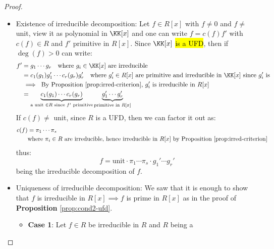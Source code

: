 \begin{proof}
	\leavevmode
	\begin{itemize}
		\item Existence of irreducible decomposition: Let \( f \in R[x] \) with \( f \ne 0 \) and \( f \ne  \)
		      unit, view it as polynomial in \( \KK[x] \) and one can write \( f = c(f) f' \) with \( c(f) \in
		      R\) and \( f' \) primitive in \( R[x] \). Since \( \KK[x]\) \hl{is a UFD}, then if \( \deg(f) > 0 \)
		      can write:
		      \[
			      \begin{aligned}
				      f' & = g_1\cdots g_r \quad \text{where } g_i \in \KK[x] \text{ are irreducible}                                               \\
				         & = c_1(g_1) g_1' \cdots c_r(g_r) g_r' \quad \text{where } g_i' \in R[x] \text{ are
				      primitive and irreducible in \( \KK[x] \) since \( g'_i \) is}                                                                \\
				         & \implies \text{ By Proposition \ref{prop:irred-criterion}, \( g_i' \) is
				      irreducible in \( R[x] \) }                                                                                                   \\
				         & = \underbrace{c_1(g_1) \cdots c_r(g_r)}_{\text{a unit }\in R \text{ since }f' \text{ primitive}} \underbrace{g_1' \cdots
					      g_r'}_{\text{primitive in } R[x]}
			      \end{aligned}
		      \]
		      If \( c(f) \ne \) unit, since \( R \) is a UFD, then we can factor it out as:
		      \[
			      \begin{aligned}
				      c(f) & = \pi_1 \cdots \pi_s                                    \\
				           & \text{where } \pi_i \in R \text{ are irreducible, hence
					      irreducible in } R[x] \text{ by Proposition \ref{prop:irred-criterion} }
			      \end{aligned}
		      \]
		      thus:
		      \[
			      f = \text{unit} \cdot \pi_1 \cdots \pi_s \cdot g_1' \cdots g_r'
		      \]
		      being the irreducible decomposition of \( f \).
		\item Uniqueness of irreducible decomposition: We saw that it is enough to show that \( f \) is
		      irreducible in \( R[x] \implies f\) is prime in \( R[x] \) as in the proof of
		      \textbf{Proposition} \ref{prop:cond2-ufd}.
		      \begin{itemize}
			      \item \textbf{Case 1}: Let \( f \in R \) be irreducible in \( R \) and \( R \) being a

\end{itemize}
\end{itemize}
\end{proof}
